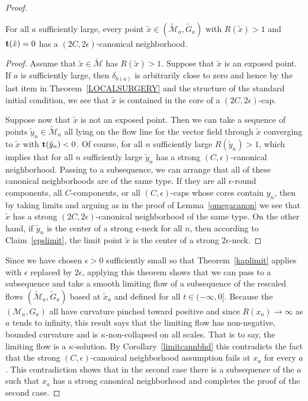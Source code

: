 \begin{proof}
\begin{claim}
\label{claim:limit-points-have-canonical-neighborhood} For all $a$ sufficiently large,
every point $\tilde x\in(\widetilde{\mathcal M}_a,\widetilde G_a)$ with $R(\tilde x)>1$ and
${\bf t}(\tilde x)=0$ has a $(2C,2\epsilon)$-canonical neighborhood.
\end{claim}


\begin{proof}
Assume that $\tilde x\in \widetilde{\mathcal M}$ has $R(\tilde
x)>1$. Suppose that $\tilde x$ is an exposed point. If $a$ is
sufficiently large, then $\delta_{b(a)}$ is arbitrarily close to
zero and hence by the last item in Theorem~\ref{LOCALSURGERY} and
the structure of the standard initial condition,  we see that
$\tilde x$ is contained in the core of a $(2C,2\epsilon)$-cap.

Suppose now that $\tilde x$ is not an exposed point.
 Then we can take a sequence of points
$\tilde y_n\in \widetilde{\mathcal M}_a$ all lying on the flow line for the vector field through $\tilde x$
converging to $\tilde x$ with ${\bf t}(\tilde y_n)<0$. Of course, for all $n$ sufficiently large
$R(\tilde y_n)>1$,
which implies that for all $n$ sufficiently large $\tilde y_n$ has a strong $(C,\epsilon)$-canonical
neighborhood. Passing to a subsequence, we can arrange that all of these canonical neighborhoods
are of the same type. If they are all $\epsilon$-round components, all $C$-components, or all
$(C,\epsilon)$-caps whose cores contain $y_n$, then by taking limits and arguing as in the proof of
Lemma~\ref{omegacanon} we see that $\tilde x$ has a strong
$(2C,2\epsilon)$-canonical neighborhood of the same type. On the other hand, if $\tilde y_n$ is the center
of a strong $\epsilon$-neck for all $n$, then according to Claim~\ref{epslimit},
the limit point $\tilde x$ is the center
of a strong $2\epsilon$-neck.
\end{proof}

Since we have chosen $\epsilon>0$ sufficiently  small so that Theorem~\ref{kaplimit}
applies with $\epsilon$ replaced by $2\epsilon$,  applying this theorem shows
that we can pass to a subsequence and take a smooth limiting
flow of a subsequence of the rescaled flows $(\widetilde {\mathcal
M}_a,\widetilde G_a)$ based at $\tilde x_a$ and defined for all
$t\in (-\infty,0]$. Because the $({\mathcal M}_a,G_a)$ all have
curvature pinched toward positive and since $R(x_a)\rightarrow \infty$
as $a$ tends to infinity, this result says that the limiting flow
has non-negative, bounded curvature and is $\kappa$-non-collapsed on
all scales. That is to say, the limiting flow is a
$\kappa$-solution. By Corollary~\ref{limitcannbhd} this contradicts
the fact that the strong $(C,\epsilon)$-canonical neighborhood
assumption fails at $x_a$ for every $a$. This contradiction shows
that in the second case there is a subsequence of the $a$ such that
$x_a$ has a strong canonical neighborhood and completes the proof of the second case.




\end{proof}
